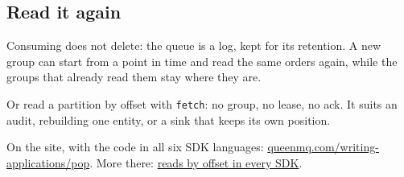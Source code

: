 
\subsection{Read it again}

Consuming does not delete: the queue is a log, kept for its retention. A new group can start from a
point in time and read the same orders again, while the groups that already read them stay where
they are.


Or read a partition by offset with \texttt{fetch}: no group, no lease, no ack. It suits an audit,
rebuilding one entity, or a sink that keeps its own position.



On the site, with the code in all six SDK languages: \href{https://queenmq.com/writing-applications/pop/}{queenmq.com/writing-applications/pop}. More there: \href{https://queenmq.com/writing-applications/clients/}{reads by offset in every SDK}.
